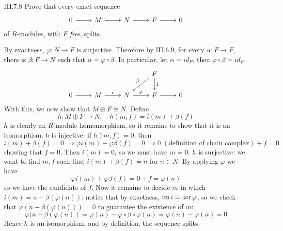 \begin{problem}{III.7.8}
Prove that every exact sequence
\[
\begin{tikzcd}
0 \arrow[r] &M \arrow[r] &N \arrow[r] &F \arrow[r] &0
\end{tikzcd}
\]
of $R$-modules, with $F$ \emph{free}, splits.
\end{problem}
\begin{pf}
By exactness, $\varphi :N \longrightarrow F$ is surjective. Therefore by III.6.9, for every $\alpha : F \to F$, there is $\beta : F \to N$ such that $\alpha = \varphi \circ \beta$. In particular, let $\alpha = id_F$, then $\varphi \circ \beta = id_F$. 
\[
\begin{tikzcd}
&  &  & F \arrow[d, "1"] \arrow[ld, "\beta"'] &   \\
0 \arrow[r] & M \arrow[r, "i"] & N \arrow[r, "\varphi"] & F \arrow[r]                           & 0
\end{tikzcd}	
\]
With this, we now show that $M \oplus F \cong N$. Define 
\[
h: M \oplus F \to N, \quad	h(m,f) = i(m) + \beta(f)
\]
$h$ is clearly an $R$-module homomorphism, so it remains to show that it is an isomorphism. $h$ is injective: if $h(m,f) = 0$, then
\[
i(m) + \beta(f) = 0 \; \Rightarrow \varphi i(m) + \varphi \beta (f) = 0 \; \Rightarrow 0 \; (\text{definition of chain complex}) + f = 0
\]
showing that $f = 0$. Then $i(m) = 0$, so we must have $m = 0$. $h$ is surjective: we want to find $m,f$ such that $i(m) + \beta(f) = n$ for $n \in N$. By applying $\varphi$ we have
\[
\varphi i(m) + \varphi \beta (f) = 0 + f = \varphi(n)	
\]
so we have the candidate of $f$. Now it remains to decide $m$ in which $i(m) = n - \beta(\varphi(n))$: notice that by exactness, $\operatorname{im} i = \ker \varphi$, so we check that $\varphi(n - \beta(\varphi(n))) = 0$ to guarantee the existence of $m$:
\[
\varphi(n - \beta(\varphi(n)) = \varphi(n) - \varphi \circ \beta \circ \varphi(n) = \varphi(n) - \varphi(n) = 0
\]
Hence $h$ is an isomorphism, and by definition, the sequence splits.
\end{pf}